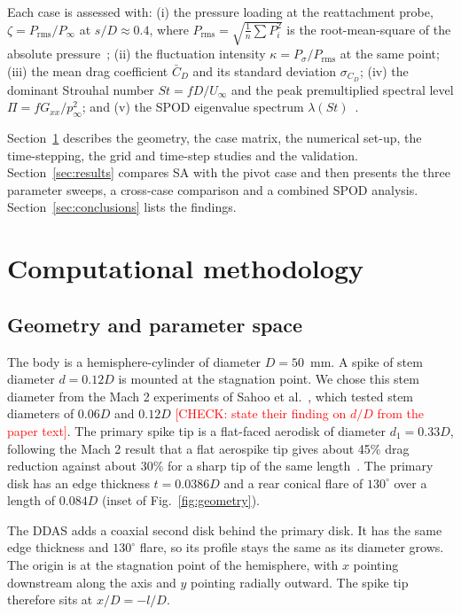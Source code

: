 \documentclass[11pt,a4paper]{article}
\newcommand{\chk}[1]{\textcolor{red}{[#1]}}
\newcommand{\Cdm}{\bar{C}_D}
\newcommand{\sCd}{\sigma_{C_D}}
\begin{document}
Each case is assessed with: (i) the pressure loading at the reattachment probe, $\zeta = P_\mathrm{rms}/P_\infty$ at $s/D \approx 0.4$, where $P_\mathrm{rms} = \sqrt{\tfrac{1}{n}\sum P_i^2}$ is the root-mean-square of the absolute pressure~\cite{Sahoo2020parametric}; (ii) the fluctuation intensity $\kappa = P_\sigma/P_\mathrm{rms}$ at the same point; (iii) the mean drag coefficient $\Cdm$ and its standard deviation $\sCd$; (iv) the dominant Strouhal number $St = fD/U_\infty$ and the peak premultiplied spectral level $\Pi = fG_{xx}/p_\infty^2$; and (v) the SPOD eigenvalue spectrum $\lambda(St)$~\cite{Schmidt2020guide}.

Section~\ref{sec:method} describes the geometry, the case matrix, the numerical set-up, the time-stepping, the grid and time-step studies and the validation. Section~\ref{sec:results} compares SA with the pivot case and then presents the three parameter sweeps, a cross-case comparison and a combined SPOD analysis. Section~\ref{sec:conclusions} lists the findings.

\section{Computational methodology}\label{sec:method}

\subsection{Geometry and parameter space}

The body is a hemisphere-cylinder of diameter $D = 50$~mm. A spike of stem diameter $d = 0.12D$ is mounted at the stagnation point. We chose this stem diameter from the Mach 2 experiments of Sahoo et al.~\cite{Sahoo2020parametric}, which tested stem diameters of $0.06D$ and $0.12D$ \chk{CHECK: state their finding on $d/D$ from the paper text}. The primary spike tip is a flat-faced aerodisk of diameter $d_1 = 0.33D$, following the Mach 2 result that a flat aerospike tip gives about 45\% drag reduction against about 30\% for a sharp tip of the same length~\cite{Sahoo2016effect}. The primary disk has an edge thickness $t = 0.0386D$ and a rear conical flare of $130^\circ$ over a length of $0.084D$ (inset of Fig.~\ref{fig:geometry}).

The DDAS adds a coaxial second disk behind the primary disk. It has the same edge thickness and $130^\circ$ flare, so its profile stays the same as its diameter grows. The origin is at the stagnation point of the hemisphere, with $x$ pointing downstream along the axis and $y$ pointing radially outward. The spike tip therefore sits at $x/D = -l/D$.
\end{document}
